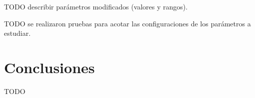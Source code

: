 \documentclass[a4paper,12pt,titlepage]{article}
\begin{document}
TODO describir parámetros modificados (valores y rangos).

TODO se realizaron pruebas para acotar las configuraciones de los parámetros a estudiar.

\section{Conclusiones}

TODO



\newpage


\end{document}

